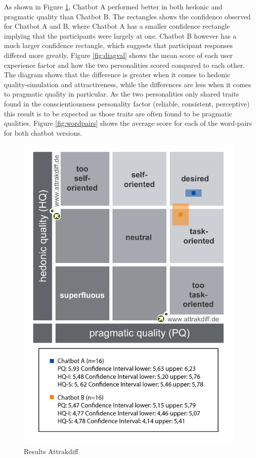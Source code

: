 As shown in Figure \ref{fig:portres}, Chatbot A performed better in both hedonic and pragmatic quality than Chatbot B. The rectangles shows the confidence observed for Chatbot A and B, where Chatbot A has a smaller confidence rectangle implying that the participants were largely at one. Chatbot B however has a much larger confidence rectangle, which suggests that participant responses differed more greatly. Figure \ref{fig:diagval} shows the mean score of each user experience factor and how the two personalities scored compared to each other. The diagram shows that the difference is greater when it comes to hedonic quality-simulation and attractiveness, while the differences are less when it comes to pragmatic quality in particular. As the two personalities only shared traits found in the conscientiousness personality factor (reliable, consistent, perceptive) this result is to be expected as those traits are often found to be pragmatic qualities. Figure \ref{fig:wordpairs} shows the average score for each of the word-pairs for both chatbot versions.

\begin{figure}[h]
    \centering
    \includegraphics[scale=0.33]{figures/Portfolio-of-results-attrakdiff.png}
    \caption{Results Attrakdiff}
    \label{fig:portres}
\end{figure}

